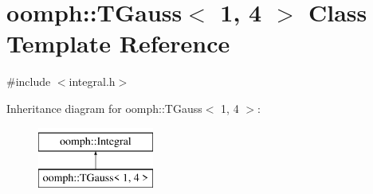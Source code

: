 \hypertarget{classoomph_1_1TGauss_3_011_00_014_01_4}{}\section{oomph\+:\+:T\+Gauss$<$ 1, 4 $>$ Class Template Reference}
\label{classoomph_1_1TGauss_3_011_00_014_01_4}


{\ttfamily \#include $<$integral.\+h$>$}

Inheritance diagram for oomph\+:\+:T\+Gauss$<$ 1, 4 $>$\+:\begin{figure}[H]
\begin{center}
\leavevmode
\includegraphics[height=2.000000cm]{classoomph_1_1TGauss_3_011_00_014_01_4}
\end{center}
\end{figure}
